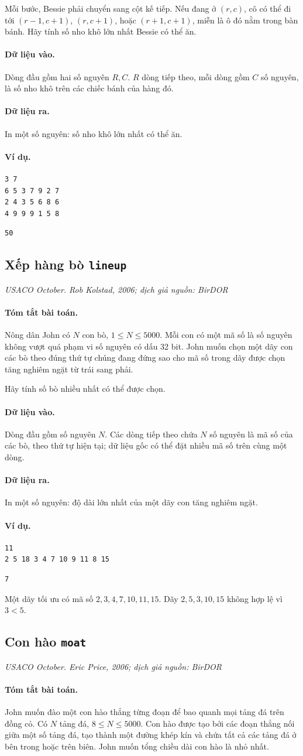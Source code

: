 \documentclass[11pt]{article}
\newcommand{\problem}[4]{%
  \subsection[#1 (#2)]{#1 \hfill {\normalsize\texttt{#2}}}%
  \noindent\textit{#3. #4}\par\smallskip
}
\newcommand{\iosec}[1]{\paragraph{#1}}
\begin{document}
Mỗi bước, Bessie phải chuyển sang cột kế tiếp. Nếu đang ở \((r,c)\), cô có
thể đi tới \((r-1,c+1)\), \((r,c+1)\), hoặc \((r+1,c+1)\), miễn là ô đó nằm
trong bàn bánh. Hãy tính số nho khô lớn nhất Bessie có thể ăn.

\iosec{Dữ liệu vào.}
Dòng đầu gồm hai số nguyên \(R,C\). \(R\) dòng tiếp theo, mỗi dòng gồm \(C\)
số nguyên, là số nho khô trên các chiếc bánh của hàng đó.

\iosec{Dữ liệu ra.}
In một số nguyên: số nho khô lớn nhất có thể ăn.

\iosec{Ví dụ.}
\begin{verbatim}
3 7
6 5 3 7 9 2 7
2 4 3 5 6 8 6
4 9 9 9 1 5 8
\end{verbatim}

\begin{verbatim}
50
\end{verbatim}

\problem{Xếp hàng bò}{lineup}{USACO October}{Rob Kolstad, 2006; dịch giả nguồn: BirDOR}

\iosec{Tóm tắt bài toán.}
Nông dân John có \(N\) con bò, \(1\le N\le 5000\). Mỗi con có một mã số là
số nguyên không vượt quá phạm vi số nguyên có dấu 32 bit. John muốn chọn một
dãy con các bò theo đúng thứ tự chúng đang đứng sao cho mã số trong dãy được
chọn tăng nghiêm ngặt từ trái sang phải.

Hãy tính số bò nhiều nhất có thể được chọn.

\iosec{Dữ liệu vào.}
Dòng đầu gồm số nguyên \(N\). Các dòng tiếp theo chứa \(N\) số nguyên là mã số
của các bò, theo thứ tự hiện tại; dữ liệu gốc có thể đặt nhiều mã số trên
cùng một dòng.

\iosec{Dữ liệu ra.}
In một số nguyên: độ dài lớn nhất của một dãy con tăng nghiêm ngặt.

\iosec{Ví dụ.}
\begin{verbatim}
11
2 5 18 3 4 7 10 9 11 8 15
\end{verbatim}

\begin{verbatim}
7
\end{verbatim}

Một dãy tối ưu có mã số \(2,3,4,7,10,11,15\). Dãy \(2,5,3,10,15\) không hợp
lệ vì \(3<5\).

\problem{Con hào}{moat}{USACO October}{Eric Price, 2006; dịch giả nguồn: BirDOR}

\iosec{Tóm tắt bài toán.}
John muốn đào một con hào thẳng từng đoạn để bao quanh mọi tảng đá trên đồng
cỏ. Có \(N\) tảng đá, \(8\le N\le 5000\). Con hào được tạo bởi các đoạn thẳng
nối giữa một số tảng đá, tạo thành một đường khép kín và chứa tất cả các tảng
đá ở bên trong hoặc trên biên. John muốn tổng chiều dài con hào là nhỏ nhất.
\end{document}
